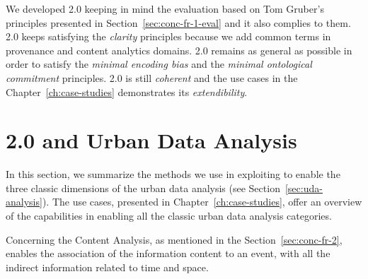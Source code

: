 We developed \frappe{} 2.0 keeping in mind the evaluation based on Tom Gruber's principles presented in Section~\ref{sec:conc-fr-1-eval} and it also complies to them.
\frappe{} 2.0 keeps satisfying the \textit{clarity} principles because we add common terms in provenance and content analytics domains. \frappe{} 2.0 remains as general as possible in order to satisfy the \textit{minimal encoding bias} and the \textit{minimal ontological commitment} principles. \frappe{} 2.0 is still \textit{coherent} and the use cases in the Chapter~\ref{ch:case-studies} demonstrates its \textit{extendibility}.

\section{\frappe{} 2.0 and Urban Data Analysis} \label{sec:conc-fr-2-analysis}

In this section, we summarize the methods we use in exploiting \frappe{} to enable the three classic dimensions of the urban data analysis (see Section~\ref{sec:uda-analysis}).
The use cases, presented in Chapter~\ref{ch:case-studies}, offer an overview of the \frappe{} capabilities in enabling all the classic urban data analysis categories.

Concerning the Content Analysis, as mentioned in the Section~\ref{sec:conc-fr-2}, \frappe{} enables the association of the information content to an event, with all the indirect information related to time and space.

